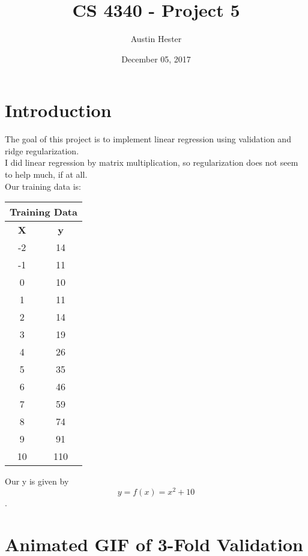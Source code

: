 \documentclass{article}
\begin{document}
\title{CS 4340 - Project 5}
\author{Austin Hester}
\date{December 05, 2017}
\maketitle

\makeatletter
\def\@seccntformat#1{%
	 \expandafter\ifx\csname c@#1\endcsname\c@section\else
	  \csname the#1\endcsname\quad
  \fi}
\makeatother



\section*{Introduction}

The goal of this project is to implement linear regression using validation and ridge regularization. \\

I did linear regression by matrix multiplication, so regularization does not seem to help much, if at all. \\

Our training data is:  

\begin{center}
\begin{tabular}{|c|c|}
	\hline
	\multicolumn{2}{|c|}{\textbf{Training Data}} \\\hline
	\textbf{X} & \textbf{y} \\\hline
	-2 & 14 \\
	-1 & 11\\
	0 & 10\\
	1 & 11 \\
	2 & 14\\
	3 & 19 \\
	4 & 26\\
	5 & 35\\
	6 & 46\\
	7 & 59\\
	8 & 74\\
	9 & 91\\
	10 & 110\\
	\hline
\end{tabular}
\end{center}

Our y is given by $$y = f(x) = x^2 + 10$$.

\newpage
\section*{Animated GIF of 3-Fold Validation}
\begin{center}
\hspace{-6em} 
\end{center}
\end{document}

